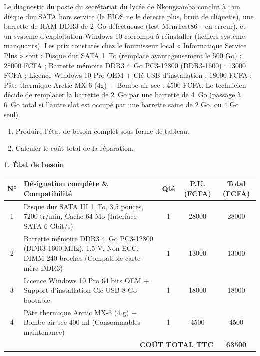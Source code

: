 \documentclass[11pt]{article}
\begin{document}
\begin{exoresolu}
Le diagnostic du poste du secrétariat du lycée de Nkongsamba conclut à : un disque dur SATA hors service (le BIOS ne le détecte plus, bruit de cliquetis), une barrette de RAM DDR3 de \SI{2}{Go} défectueuse (test MemTest86+ en erreur), et un système d'exploitation Windows 10 corrompu à réinstaller (fichiers système manquants). Les prix constatés chez le fournisseur local « Informatique Service Plus » sont : Disque dur SATA \SI{1}{To} (remplace avantageusement le 500 Go) : \num{28000} FCFA ; Barrette mémoire DDR3 \SI{4}{Go} PC3-12800 (DDR3-1600) : \num{13000} FCFA ; Licence Windows 10 Pro OEM + Clé USB d'installation : \num{18000} FCFA ; Pâte thermique Arctic MX-6 (4g) + Bombe air sec : \num{4500} FCFA. Le technicien décide de remplacer la barrette de \SI{2}{Go} par une barrette de \SI{4}{Go} (passage à \SI{6}{Go} total si l'autre slot est occupé par une barrette saine de 2 Go, ou 4 Go seul).
\begin{enumerate}
\item Produire l'état de besoin complet sous forme de tableau.
\item Calculer le coût total de la réparation.
\end{enumerate}
\tcblower
\textbf{1. État de besoin}

\begin{center}
\begin{tabularx}{\linewidth}{|c|X|c|c|c|}
\hline
\rowcolor{popblueL} \textbf{N°} & \textbf{Désignation complète \& Compatibilité} & \textbf{Qté} & \textbf{P.U. (FCFA)} & \textbf{Total (FCFA)} \\
\hline
1 & Disque dur SATA III \SI{1}{To}, 3,5 pouces, 7200 tr/min, Cache 64 Mo (Interface SATA 6 Gbit/s) & 1 & \num{28000} & \num{28000} \\
\hline
2 & Barrette mémoire DDR3 \SI{4}{Go} PC3-12800 (DDR3-1600 MHz), 1,5 V, Non-ECC, DIMM 240 broches (Compatible carte mère DDR3) & 1 & \num{13000} & \num{13000} \\
\hline
3 & Licence Windows 10 Pro 64 bits OEM + Support d'installation Clé USB 8 Go bootable & 1 & \num{18000} & \num{18000} \\
\hline
4 & Pâte thermique Arctic MX-6 (4 g) + Bombe air sec 400 ml (Consommables maintenance) & 1 & \num{4500} & \num{4500} \\
\hline
\multicolumn{4}{|r|}{\textbf{COÛT TOTAL TTC}} & \textbf{\num{63500}} \\
\hline
\end{tabularx}
\end{center}


\end{exoresolu}
\end{document}
